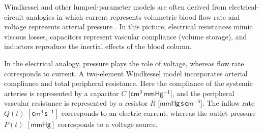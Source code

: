 \documentclass[alpha-refs, 12pt]{wiley-article}
\begin{document}
Windkessel and other lumped-parameter models are often derived from electrical-circuit analogies in which current represents volumetric blood flow rate and voltage represents arterial pressure \cite{Avolio1980, Segers1998, Milisic2004}. In this picture, electrical resistances mimic viscous losses, capacitors represent vascular compliance (volume storage), and inductors reproduce the inertial effects of the blood column.

In the electrical analogy, pressure plays the role of voltage, whereas flow rate corresponds to current. A two-element Windkessel model incorporates arterial compliance and total peripheral resistance. Here the compliance of the systemic arteries is represented by a capacitor \(\!C\) \(\bigl[\mathsf{cm^{3}\,mmHg^{-1}}\bigr]\), and the peripheral vascular resistance is represented by a resistor \(R\) \(\bigl[\mathsf{mmHg\,s\,cm^{-3}}\bigr]\). The inflow rate \(Q(t)\) \([\mathsf{cm^{3}\,s^{-1}}]\) corresponds to an electric current, whereas the outlet pressure \(P(t)\) \([\mathsf{mmHg}]\) corresponds to a voltage source.
\end{document}
